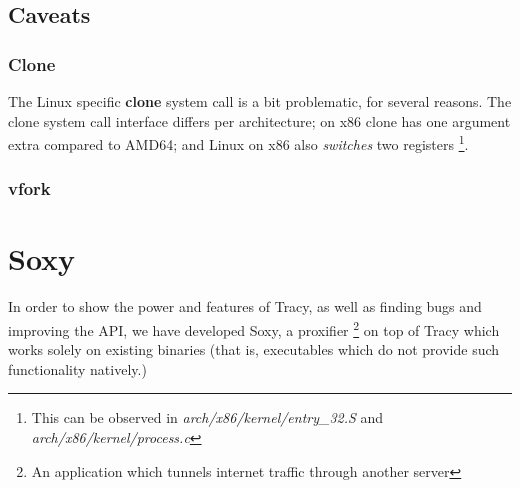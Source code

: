 \documentclass[a4paper, 10pt]{report}
\begin{document}
\section{Caveats}


\subsection{Clone}

The Linux specific \textbf{clone} system call is a bit problematic, for
several reasons. The clone system call interface differs per architecture;
on x86 clone has one argument extra compared to AMD64; and Linux on x86
also \textit{switches} two registers
\footnote{This can be observed in \textit{arch/x86/kernel/entry\_32.S}
and \textit{arch/x86/kernel/process.c}}.



\subsection{vfork}


%


\chapter{Soxy}

\label{chapter:soxy}

In order to show the power and features of Tracy, as well as finding bugs and
improving the API, we have developed Soxy, a proxifier \footnote{An
application which tunnels internet traffic through another server} on top of
Tracy which works solely on existing binaries (that is, executables which do
not provide such functionality natively.)
\end{document}
